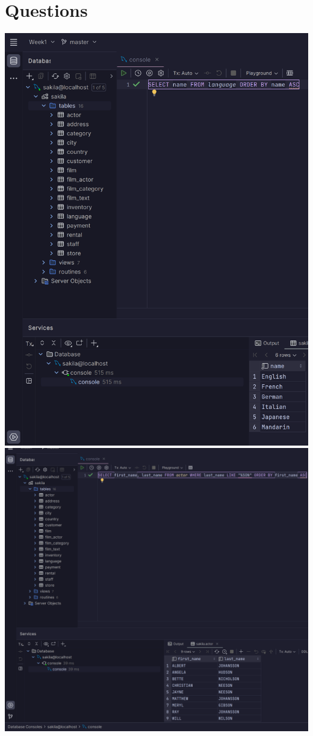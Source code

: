 \documentclass{exam}
\begin{document}
\section{Questions}
\begin{questions}
	\question
	\includegraphics[width=\textwidth,height=\textheight,keepaspectratio]{question1}
	\question
	\includegraphics[width=\textwidth,height=\textheight,keepaspectratio]{question2}

\end{questions}
\end{document}
